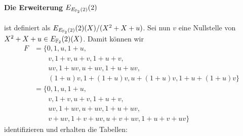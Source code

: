 \paragraph{Die Erweiterung $E_{E_{\mathbb{F}_2}(2)}(2)$} ist definiert als
$E_{E_{\mathbb{F}_2}(2)}(2)(X)/(X^2+X+u)$.
Sei nun $v$ eine Nullstelle von $X^2+X+u\in E_{\mathbb{F}_2}(2)(X)$.
Damit können wir
\begin{align*}
F&=\{ 0        , 1        , u          , 1+u             , \\
&\qquad v      , 1+v      , u+v        , 1+u+v           , \\
&\qquad uv     , 1+uv     , u+uv       , 1+u+uv          , \\
&\qquad (1+u)v , 1+(1+u)v , u + (1+u)v , 1+u + (1+u)v \}   \\
&=\{ 0       , 1      , u        , 1+u           , \\
&\qquad v    , 1+v    , u+v      , 1+u+v         , \\
&\qquad uv   , 1+uv   , u+uv     , 1+u+uv        , \\
&\qquad v+uv , 1+v+uv , u + v+uv , 1+u + v+uv \}
\end{align*}
identifizieren und erhalten die Tabellen: 


